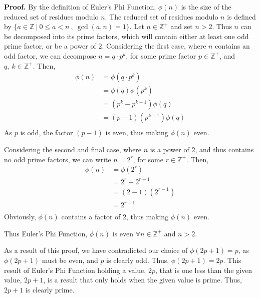 \documentclass[a4paper]{article}
\begin{document}
\begin{enumerate}
\begin{enumerate}
		\textbf{Proof.} By the definition of Euler's Phi Function, $\displaystyle{\phi(n)}$ is the size of the reduced set of residues modulo $\displaystyle{n}$. The reduced set of residues modulo $\displaystyle{n}$ is defined by $\displaystyle{\{a\in \mathbb{Z}\: |\: 0 \leq a < n \:,\: \gcd(a,n) = 1  \}}$. Let $\displaystyle{n \in \mathbb{Z}^+}$ and set $\displaystyle{n>2}$. Thus $\displaystyle{n}$ can be decomposed into its prime factors, which will contain either at least one odd prime factor, or be a power of $\displaystyle{2}$. 
		\bigbreak
		Considering the first case, where $\displaystyle{n}$ contains an odd factor, we can decompose $\displaystyle{n = q\cdot p^k}$, for some prime factor $\displaystyle{p \in \mathbb{Z}^+}$, and $\displaystyle{q,\:k \in \mathbb{Z}^+}$. Then,
		\begin{align*}
		\phi(n) & = \phi\left(q\cdot p^k \right)\\
		& = \phi(q)\phi(p^k)\\
		& = \left(p^k - p^{k-1}\right)\phi(q)\\
		& = (p-1)\left(p^{k-1} \right)\phi(q)\\
		\end{align*}
		As $\displaystyle{p}$ is odd, the factor $\displaystyle{(p-1)}$ is even, thus making $\displaystyle{\phi(n)}$ even.

		\bigbreak

		Considering the second and final case, where $\displaystyle{n}$ is a power of $\displaystyle{2}$, and thus contains no odd prime factors, we can write $\displaystyle{n = 2^r}$, for some $\displaystyle{r \in \mathbb{Z}^+}$. Then,
		\begin{align*}
		\phi(n) & = \phi\left(2^r \right)\\
		& = 2^r - 2^{r-1}\\
		& = (2-1)\left(2^{r-1}\right)\\
		& = 2^{r-1}\\
		\end{align*}
		Obviously, $\displaystyle{\phi(n)}$ contains a factor of 2, thus making $\displaystyle{\phi(n)}$ even. 

		\bigbreak

		Thus Euler's Phi Function, $\displaystyle{\phi(n)}$ is even $\displaystyle{\forall n \in \mathbb{Z}^+}$ and $\displaystyle{n > 2}$.

		\bigbreak

		As a result of this proof, we have contradicted our choice of $\displaystyle{\phi(2p+1) = p}$, as $\displaystyle{\phi(2p+1)}$ must be even, and $\displaystyle{p}$ is clearly odd. Thus, $\displaystyle{\phi(2p+1) = 2p}$. This result of Euler's Phi Function holding a value, $\displaystyle{2p}$, that is one less than the given value, $\displaystyle{2p+1}$, is a result that only holds when the given value is prime. Thus, $\displaystyle{2p+1}$ is clearly prime.


\end{enumerate}
\end{enumerate}
\end{document}
